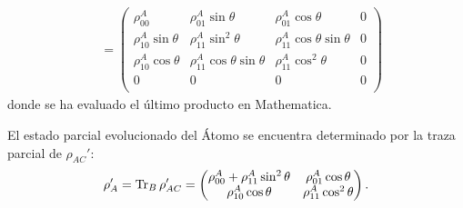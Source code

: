 \documentclass{scrartcl}
\DeclareRobustCommand{\[}{\begin{equation}}
\DeclareRobustCommand{\]}{\end{equation}}
\begin{document}
\begin{enumerate}
\begin{align}
        &=
        \begin{pmatrix}
            \rho^A_{00} & \rho^A_{01} \sin\theta & \rho^A_{01} \cos\theta & 0 \\
            \rho^A_{10} \sin\theta & \rho^A_{11} \sin^2\theta & \rho^A_{11} \cos\theta \sin\theta & 0 \\
            \rho^A_{10} \cos\theta & \rho^A_{11} \cos\theta \sin\theta & \rho^A_{11} \cos^2\theta & 0 \\
            0 & 0 & 0 & 0 \\
        \end{pmatrix}
    \end{align}
    donde se ha evaluado el último producto en Mathematica.
    
    El estado parcial evolucionado del Átomo se encuentra determinado por la traza parcial de $\rho_{AC}'$:
    \[
        \rho_A' = \Tr_B \rho_{AC}' = 
        \begin{pmatrix}
            \rho^A_{00} + \rho^A_{11} \sin^2\theta & \rho^A_{01} \cos\theta \\
            \rho^A_{10} \cos\theta & \rho^A_{11} \cos^2\theta \\
        \end{pmatrix}.
        \label{eq:I_4_1}
    \]
    

\end{enumerate}
\end{document}
